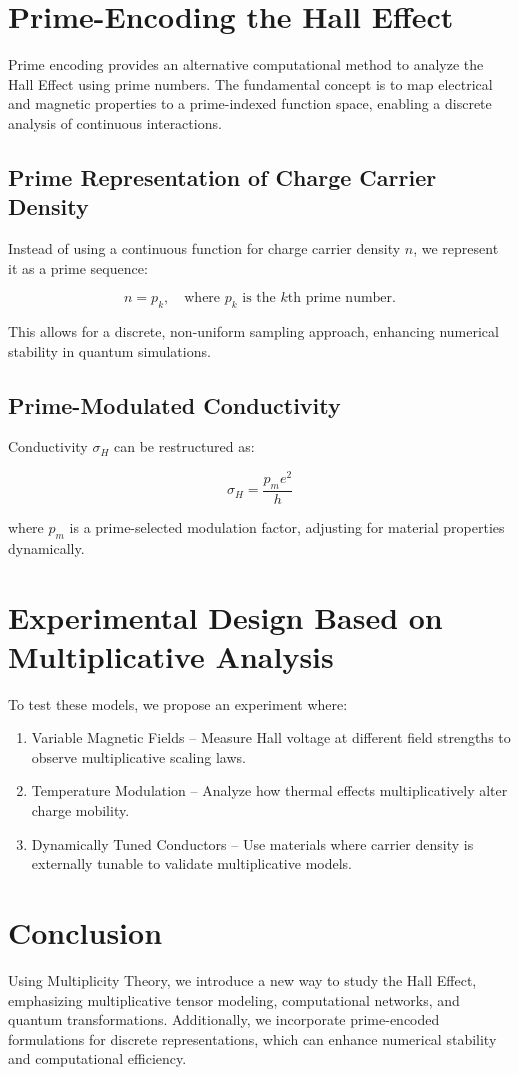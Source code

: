 \documentclass{article}
\theoremstyle{plain}
\begin{document}
\section{Prime-Encoding the Hall Effect}

Prime encoding provides an alternative computational method to analyze the Hall Effect using prime numbers. The fundamental concept is to map electrical and magnetic properties to a prime-indexed function space, enabling a discrete analysis of continuous interactions.

\subsection{Prime Representation of Charge Carrier Density}
Instead of using a continuous function for charge carrier density $n$, we represent it as a prime sequence:

\begin{equation}
n = p_k, \quad \text{where } p_k \text{ is the } k\text{th prime number.}
\end{equation}

This allows for a discrete, non-uniform sampling approach, enhancing numerical stability in quantum simulations.

\subsection{Prime-Modulated Conductivity}
Conductivity $\sigma_H$ can be restructured as:

\begin{equation}
\sigma_H = \frac{p_m e^2}{h}
\end{equation}

where $p_m$ is a prime-selected modulation factor, adjusting for material properties dynamically.

\section{Experimental Design Based on Multiplicative Analysis}
To test these models, we propose an experiment where:
\begin{enumerate}
\item Variable Magnetic Fields – Measure Hall voltage at different field strengths to observe multiplicative scaling laws.
\item Temperature Modulation – Analyze how thermal effects multiplicatively alter charge mobility.
\item Dynamically Tuned Conductors – Use materials where carrier density is externally tunable to validate multiplicative models.
\end{enumerate}

\section{Conclusion}
Using Multiplicity Theory, we introduce a new way to study the Hall Effect, emphasizing multiplicative tensor modeling, computational networks, and quantum transformations. Additionally, we incorporate prime-encoded formulations for discrete representations, which can enhance numerical stability and computational efficiency.
\end{document}
